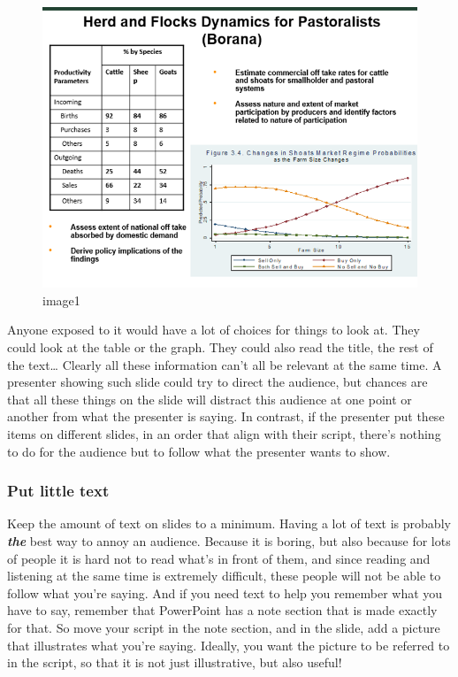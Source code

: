 \documentclass[
]{book}
\begin{document}
\begin{figure}
\centering
\includegraphics{img/audience_slide1.png}
\caption{image1}
\end{figure}

Anyone exposed to it would have a lot of choices for things to look at. They could look at the table or the graph. They could also read the title, the rest of the text\ldots{} Clearly all these information can't all be relevant at the same time. A presenter showing such slide could try to direct the audience, but chances are that all these things on the slide will distract this audience at one point or another from what the presenter is saying. In contrast, if the presenter put these items on different slides, in an order that align with their script, there's nothing to do for the audience but to follow what the presenter wants to show.

\hypertarget{put-little-text}{%
\subsubsection{Put little text}\label{put-little-text}}

Keep the amount of text on slides to a minimum. Having a lot of text is probably \textbf{\emph{the}} best way to annoy an audience. Because it is boring, but also because for lots of people it is hard not to read what's in front of them, and since reading and listening at the same time is extremely difficult, these people will not be able to follow what you're saying. And if you need text to help you remember what you have to say, remember that PowerPoint has a note section that is made exactly for that. So move your script in the note section, and in the slide, add a picture that illustrates what you're saying. Ideally, you want the picture to be referred to in the script, so that it is not just illustrative, but also useful!
\end{document}
